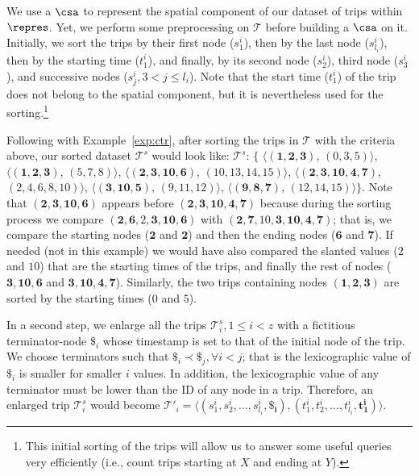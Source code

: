 We use a $\csa$ to represent the spatial component of our dataset of trips within $\repres$. Yet,
we perform some preprocessing on $\mathcal{T}$ before building a $\csa$ on it. Initially, we 
sort the trips by their first node ($s^i_1$), then by the last node ($s^i_{l_i}$), then by the starting time
($t^i_1$), and finally, by its second node ($s^i_2$), third node ($s^i_3$), and successive nodes ($s^i_j, 3<j\leq l_i$). 
Note that the start time ($t^i_1$) of the trip does not belong to the spatial component, 
but it is nevertheless used for the sorting.\footnote{This initial sorting of the trips will allow us 
to answer some useful queries very efficiently  (i.e., count trips starting at $X$ and ending at $Y$).} 

Following with Example~\ref{exp:ctr}, after sorting the trips in $\mathcal{T}$ with the criteria above, 
our sorted dataset $\mathcal{T}^s$ would look like: 
$\mathcal{T}^s$: $\{$%
$\langle (\mathbf{1,2,3     })$, $(\mathit{0,3,5})                     \rangle$, 
$\langle (\mathbf{1,2,3     })$, $(\mathit{5,7,8})                     \rangle$, 
$\langle (\mathbf{2,3,10,6  })$, $(\mathit{10,13,14,15})           \rangle$, 
$\langle (\mathbf{2,3,10,4,7})$, $(\mathit{2,4,6,8,10}) \rangle$, 
$\langle (\mathbf{3,10,5    })$, $(\mathit{9,11,12})                     \rangle$, 
$\langle (\mathbf{9,8,7     })$, $(\mathit{12,14,15})                    \rangle$$\}$. 
Note that  $ (\mathbf{2,3,10,6  })$ appears before $(\mathbf{2,3,10,4,7})$ because
during the sorting process we compare $ (\mathbf{2,6,\mathit{2},3, 10,6  })$ with $ (\mathbf{2,7,\mathit{10},3, 10,4,7})$;
that is, we compare the starting nodes ($\mathbf{2}$ and $\mathbf{2}$) and then the ending nodes ($\mathbf{6}$ and $\mathbf{7}$).
If needed  (not in this example) we would have also compared the slanted values ($\mathit{2}$ and $\mathit{10}$) 
that are the starting times of the trips, and finally the rest of nodes  ($ \mathbf{3, 10,6  }$ and $ \mathbf{3, 10,4,7}$).
Similarly, the two trips containing nodes $ (\mathbf{1,2,3})$ are sorted by the starting times ($\mathit{0}$ and $\mathit{5}$).


In a second step, we enlarge all the trips $\mathcal{T}^s_i, 1\!\leq\!i\!<\!z$ with a fictitious terminator-node $\$_i$ whose
timestamp is set to that of the initial node of the trip. We choose terminators such that $\$_i \prec \$_j, \forall i<j$; 
that is the lexicographic value of $\$_i$ is smaller for smaller $i$ values. In addition, the lexicographic value
of any terminator must be lower than the ID of any node in a trip. Therefore, an enlarged trip $\mathcal{T}^s_i$
would become $\mathcal{T}'_i =  \langle (s^i_1, s^i_2, \dots,  s^i_{l_i}, 
\mathbf{\$_i}),(t^i_1, t^i_2, \dots,  t^i_{l_i}, \mathbf{t^i_1}) \rangle$. 

